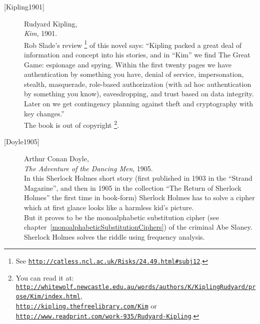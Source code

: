 \begin{description}
\item[\textrm{[Kipling1901]}] 
    Rudyard Kipling, \\
    {\em Kim}, 1901. \\
    Rob Slade's review%
    \footnote{See
          \href{http://catless.ncl.ac.uk/Risks/24.49.html\#subj12}
       {\texttt{http://catless.ncl.ac.uk/Risks/24.49.html\#subj12}}.
    }
    of this novel says:
    ``Kipling packed a great deal of information and concept into his stories,
    and in ``Kim'' we find The Great Game: espionage and spying.  Within the
    first twenty pages we have authentication by something you have, denial
    of service, impersonation, stealth, masquerade, role-based
    authorization (with ad hoc authentication by something you know),
    eavesdropping, and trust based on data integrity.  Later on we get
    contingency planning against theft and cryptography with key changes.''\\
    The book is out of copyright%
    \footnote{You can read it at:\\
          \href{http://whitewolf.newcastle.edu.au/words/authors/K/KiplingRudyard/prose/Kim/index.html}
       {\texttt{http://whitewolf.newcastle.edu.au/words/authors/K/KiplingRudyard/prose/Kim/index.html}},\\
          \href{http://kipling.thefreelibrary.com/Kim}
       {\texttt{http://kipling.thefreelibrary.com/Kim}} or\\
          \href{http://www.readprint.com/work-935/Rudyard-Kipling}
       {\texttt{http://www.readprint.com/work-935/Rudyard-Kipling}}.
    }.\\


\item[\textrm{[Doyle1905]}] 
    Arthur Conan Doyle, \\
    {\em The Adventure of the Dancing Men}, 1905. \\
    In this Sherlock Holmes short story (first published in 1903 in the
    ``Strand Magazine'', and then in 1905 in the collection 
    ``The Return of Sherlock Holmes'' the first time in book-form)
    Sherlock Holmes has to solve a cipher which at first glance looks
    like a harmless kid's picture. \\
    But it proves to be the monoalphabetic substitution cipher (see
    chapter~\ref{monoalphabeticSubstitutionCiphers}) of the criminal Abe
    Slaney.
    Sherlock Holmes solves the riddle using frequency analysis.\\



\end{description}
